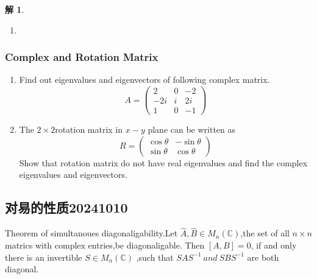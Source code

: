 \documentclass{article}
\newtheorem{solution}{解}
\newcommand{\pmtwo}[4]{
    \begin{pmatrix}
        #1&#2\\
        #3&#4
    \end{pmatrix}
    }
\newcommand{\pmthree}[9]{
    \begin{pmatrix}
        #1&#2&#3\\
        #4&#5&#6\\
        #7&#8&#9
    \end{pmatrix}
}
\newcommand{\vmtwo}[4]{
    \begin{vmatrix}
        #1&#2\\
        #3&#4
    \end{vmatrix}
    }
\begin{document}
\begin{solution}
\begin{enumerate}
    令其本征行列式值为零求解其本征值
    \begin{align*}
        \vmtwo{-\lambda}{1}{-2}{3-\lambda}&=0\\
        (\lambda-2)(\lambda-1)&=0
    \end{align*}
    因此本征值$\lambda=2,1$,将其分别带入到方程当中，我们可以得到两个本征矢量。
    \[\begin{pmatrix}
        1\\
        2
    \end{pmatrix}和
    \begin{pmatrix}
        1\\
        1
    \end{pmatrix}\]
    通过施密特正交化过程，我们可以得到两个正交归一的本征矢量
    \[\begin{pmatrix}
        \frac{1}{\sqrt{2}}\\
        \frac{1}{\sqrt{2}}
    \end{pmatrix}和
    \begin{pmatrix}
        -\frac{1}{\sqrt{2}}\\
        \frac{1}{\sqrt{2}}
    \end{pmatrix}\]
    \item[d]
\end{enumerate}
\end{solution}






\subsubsection{Complex and Rotation Matrix}
\begin{enumerate}
    \item Find out eigenvalues and eigenvectors of following complex matrix.
    \[A=\pmthree{2}{0}{-2}{-2i}{i}{2i}{1}{0}{-1}\]
    \item The $2\times 2$rotation matrix in $x-y$ plane can be written as
    \[R=\pmtwo{\cos\theta}{-\sin\theta}{\sin\theta}{\cos\theta}\]
    Show that rotation matrix do not have real eigenvalues and find the complex eigenvalues and eigenvectors.
\end{enumerate}






\subsection{对易的性质20241010}
Theorem of simultanoues diagonaligability.Let $\hat{A},\hat{B}\in M_n(\mathbb{C})$,the set of all $n\times n$ matrics with complex entries,be diagonaligable. Then $[A,B]=0$, if and only there is an invertible $S\in M_n(\mathbb{C})$ ,such that $SAS^{-1} \ and\  SBS^{-1}$ are both diagonal.
\end{document}
